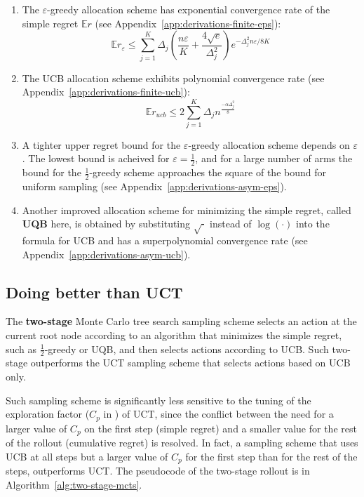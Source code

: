 \documentclass{article}
\newcommand {\IE} {\ensuremath {\mathbb{E}}}
\begin{document}
\begin{enumerate}
\item The $\varepsilon$-greedy allocation scheme has exponential convergence
rate of the simple regret $\IE r$ (see Appendix~\ref{app:derivations-finite-eps}):
\begin{equation}
  \IE r_\varepsilon\le\sum_{j=1}^K\Delta_j\left(\frac {n\varepsilon} K + \frac {4\sqrt e}
{\Delta_j^2}\right)e^{-\Delta_j^2n\varepsilon/8K}
\end{equation}
\item The UCB allocation scheme exhibits polynomial convergence
rate (see Appendix~\ref{app:derivations-finite-ucb}):
\begin{equation}
\IE r_{ucb} \le 2\sum_{j=1}^K \Delta_jn^{\frac {-\alpha \Delta_j^2} 8}
\end{equation}
\item A tighter upper regret bound for the $\varepsilon$-greedy allocation scheme depends on
$\varepsilon$. The lowest bound is
acheived for $\varepsilon=\frac 1
2$, and for a large number of arms the bound for the $\frac 1 2$-greedy scheme approaches the square of the
bound for uniform sampling (see
Appendix~\ref{app:derivations-asym-eps}).

\item Another improved allocation scheme for minimizing the simple regret,
called \textbf{UQB} here, is obtained by substituting $\sqrt{\cdot}$
instead of $\log(\cdot)$ into the formula for UCB and has a
superpolynomial convergence rate (see
Appendix~\ref{app:derivations-asym-ucb}).
\end{enumerate}


\subsection{Doing better than UCT}

The {\bf two-stage} Monte Carlo tree search sampling
scheme selects an action at the current root node according to an
algorithm that minimizes the simple regret, such as $\frac 1 2$-greedy or
UQB, and then selects actions according to UCB. Such two-stage
outperforms the UCT sampling scheme that selects actions based on
UCB only.

Such sampling scheme is significantly less sensitive to the tuning of
the exploration factor ($C_p$ in \cite{Kocsis.uct}) of UCT, since the
conflict \cite{Bubeck.pure} between the need for a larger value of
$C_p$ on the first step (simple regret) and a smaller value for the
rest of the rollout (cumulative regret) is resolved. In fact, a
sampling scheme that uses UCB at all steps but a larger value of $C_p$
for the first step than for the rest of the steps, outperforms
UCT. The pseudocode of the two-stage rollout is in
Algorithm~\ref{alg:two-stage-mcts}.
\end{document}
